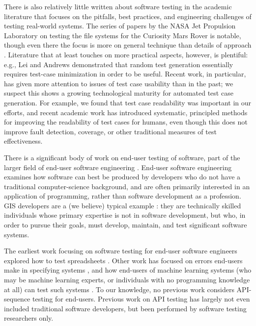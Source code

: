 There is also relatively little written about software testing in the
academic literature that focuses on the pitfalls, best practices, and
engineering challenges of testing real-world systems.  The series of
papers by the NASA Jet Propulsion Laboratory on testing the file
systems for the Curiosity Mars Rover is notable, though even there the
focus is more on general technique than details of approach
\cite{ICSEDiff,CFV08,AMAI}.  Literature that at least touches on more
practical aspects, however, is plentiful: e.g., Lei and Andrews
\cite{MinUnit} demonstrated that random test generation essentially
requires test-case minimization \cite{DD} in order to be useful.
Recent work, in particular, has given more attention to issues of test case usability
than in the past; we suspect this shows a growing technological
maturity for automated test case generation.  For example, we found
that test case readability was important in our efforts, and recent
academic work \cite{Readable,Guava} has introduced systematic,
principled methods for improving the readability of test cases for
humans, even though this does not improve fault detection, coverage,
or other traditional measures of test effectiveness.

There is a significant body of work on end-user testing of software,
part of the larger field of end-user software engineering
\cite{burnettEUSE,Silos}.  End-user software engineering examines how
software can best be produced by developers who do not have a
traditional computer-science background, and are often primarily
interested in an application of programming, rather than software
development as a profession.  GIS developers are a (we believe)
typical example \cite{Segal07}:  they are technically skilled  individuals whose
primary expertise is not in software development, but who, in order to
pursue their goals, must develop, maintain, and test significant
software systems.

The earliest work focusing on software testing for
end-user software engineers explored how to test spreadsheets
\cite{rothermelTOSEM,rothermel2000wysiwyt}.  Other work has focused on
errors end-users make in specifying systems \cite{Phalgune}, and how
end-users of machine learning systems (who may be machine learning
experts, or individuals with no programming knowledge at all) can test
such systems \cite{OnlyOracle,kulesza-eud11,shinsel-vlhcc}.  To our
knowledge, no previous work considers API-sequence testing for
end-users.  Previous work on API testing has largely not even included
traditional software developers, but been performed by software
testing researchers only.

